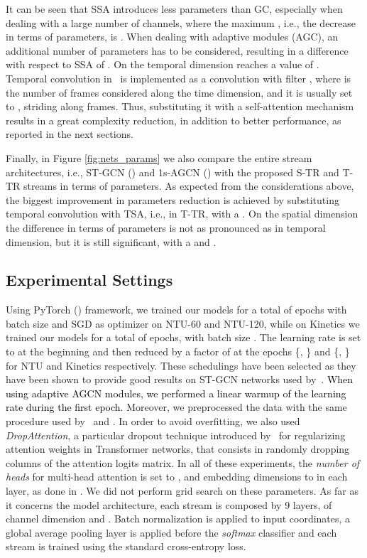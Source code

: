 \documentclass[times,twocolumn,final,authoryear]{elsarticle}
\DeclareRobustCommand{\new}[1]
{{\textcolor{black}{#1}}}
\begin{document}
It can be seen that SSA introduces less parameters than GC, especially when dealing with a large number of channels, where the maximum , i.e., the decrease in terms of parameters, is . When dealing with adaptive modules (AGC), an additional number of parameters has to be considered, resulting in a difference with respect to SSA of . 
On the temporal dimension  reaches a value of . Temporal convolution in~\cite{yan2018spatial} is implemented as a  convolution with filter , where  is the number of frames considered along the time dimension, and it is usually set to , striding along  frames. Thus, substituting it with a self-attention mechanism results in a great complexity reduction, in addition to better performance, as reported in the next sections. 




Finally, in Figure \ref{fig:nets_params} we also compare the entire stream architectures, i.e., ST-GCN (\cite{yan2018spatial}) and 1s-AGCN (\cite{Shi2018TwoStreamAG}) with the proposed S-TR and T-TR streams in terms of parameters.
As expected from the considerations above, the biggest improvement in parameters reduction is achieved by substituting temporal convolution with TSA, i.e., in T-TR, with a . On the spatial dimension the difference in terms of parameters is not as pronounced as in temporal dimension, but it is still significant, with a  and . 



\subsection{{Experimental Settings}} Using PyTorch (\cite{paszke2019pytorch}) framework, we trained our models for a total of  epochs with batch size  and SGD as optimizer on NTU-60 and NTU-120, while on Kinetics we trained our models for a total of  epochs, with batch size . The learning rate is set to  at the beginning and then reduced by a factor of  at the epochs \{, \} and \{, \} for NTU and Kinetics respectively. These schedulings have been selected as they have been shown to provide good results on ST-GCN networks used by~\cite{dirgraph}. \new{When using adaptive AGCN modules, we performed a linear warmup of the learning rate during the first epoch.} Moreover, we preprocessed the data with the same procedure used by~\cite{Shi2018TwoStreamAG} and \cite{dirgraph}. In order to avoid overfitting, we also used \textit{DropAttention}, a particular dropout technique introduced by~\cite{Lin2019DropAttentionAR} for regularizing attention weights in Transformer networks, that consists in randomly dropping columns of the attention logits matrix. In all of these experiments, the \textit{number of heads} for multi-head attention is set to , and  embedding dimensions to  in each layer, as done in \cite{DBLP:journals/corr/abs-1904-09925}. We did not perform grid search on these parameters. As far as it concerns the model architecture, each stream is composed by 9 layers, of channel dimension  and . Batch normalization is applied to input coordinates, a global average pooling layer is applied before the \textit{softmax} classifier and each stream is trained using the standard cross-entropy loss.
\end{document}
